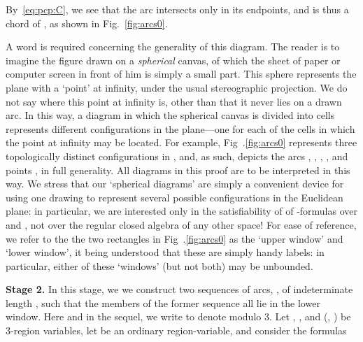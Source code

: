 \documentclass{article}
\begin{document}
By~\eqref{eq:pcp:C}, we see that the arc 
intersects  only in its endpoints, and is thus a chord of
, as shown in Fig.~\ref{fig:arcs0}.

A word is required concerning the generality of this diagram.  The
reader is to imagine the figure drawn on a {\em spherical} canvas, of
which the sheet of paper or computer screen in front of him is simply
a small part.  This sphere represents the plane with a `point' at
infinity, under the usual stereographic projection. We do not say
where this point at infinity is, other than that it never lies on a
drawn arc.  In this way, a diagram in which the spherical canvas is
divided into  cells represents  different configurations in the
plane---one for each of the cells in which the point at infinity may
be located. For example, Fig~.\ref{fig:arcs0} represents three
topologically distinct configurations in , and, as such, depicts
the arcs , ,
, ,  and points ,  in full
generality.  All diagrams in this proof are to be interpreted in this
way.  We stress that our `spherical diagrams' are simply a convenient
device for using one drawing to represent several possible
configurations in the Euclidean plane: in particular, we are
interested only in the satisfiability of of -formulas over
 and , not over the regular closed algebra of
any other space!  For ease of reference, we refer to the the two
rectangles in Fig~.\ref{fig:arcs0} as the `upper window' and `lower
window', it being understood that these are simply handy labels: in
particular, either of these `windows' (but not both) may be unbounded.

\bigskip

\noindent
\textbf{Stage 2.}  In this stage, we we construct two sequences of
arcs, ,  of indeterminate length , such that the members of the former sequence all lie in the lower
window. Here and in the sequel, we write  to denote  modulo
3.  Let , ,  and 
(, ) be 3-region variables, let  be
an ordinary region-variable, and consider the formulas
\end{document}
